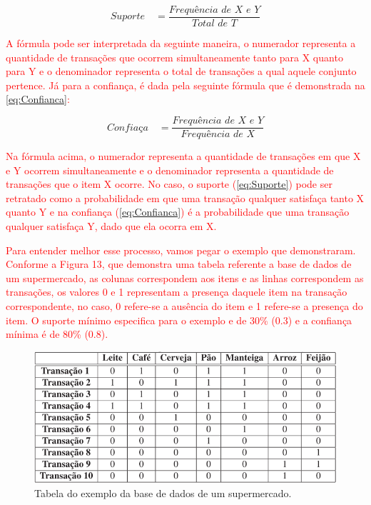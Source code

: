 \begin{equation}
    \label{eq:Suporte}
        {\textit{Suporte}\quad =\frac { \textit{Frequência de X e Y} }{ \textit{Total de T}} }
\end{equation}

\par
\textcolor{red}{A fórmula pode ser interpretada da seguinte maneira, o numerador representa a quantidade de transações que ocorrem simultaneamente tanto para X quanto para Y e o denominador representa o total de transações a qual aquele conjunto pertence. Já para a confiança, é dada pela seguinte fórmula que é demonstrada na \autoref{eq:Confianca}:}

\begin{equation}
    \label{eq:Confianca}
        {\textit{Confiaça}\quad =\frac { \textit{Frequência de X e Y} }{ \textit{Frequência de X}} }
\end{equation}

\par
\textcolor{red}{Na fórmula acima, o numerador representa a quantidade de transações em que X e Y ocorrem simultaneamente e o denominador representa a quantidade de transações que o item X ocorre. No caso, o suporte (\autoref{eq:Suporte}) pode ser retratado como a probabilidade em que uma transação qualquer satisfaça tanto X quanto Y e na confiança (\autoref{eq:Confianca}) é a probabilidade que uma transação qualquer satisfaça Y, dado que ela ocorra em X.}

\par
\textcolor{red}{Para entender melhor esse processo, vamos pegar o exemplo que  demonstraram. Conforme a Figura 13, que demonstra uma tabela referente a base de dados de um supermercado, as colunas correspondem aos itens e as linhas correspondem as transações, os valores 0 e 1 representam a presença daquele item na transação correspondente, no caso, 0 refere-se a ausência do item e 1 refere-se a presença do item. O suporte mínimo especifica para o exemplo e de 30\% (0.3) e a confiança mínima é de 80\% (0.8).}


\begin{figure}[!htp]
	\begin{center}
    \caption{\label{fig:waveform_fig} Tabela do exemplo da base de dados de um supermercado.}
	\includegraphics[scale=0.80]{Figuras/Tabela_da_base_de_supermercado.png}
	\end{center}
\end{figure}


